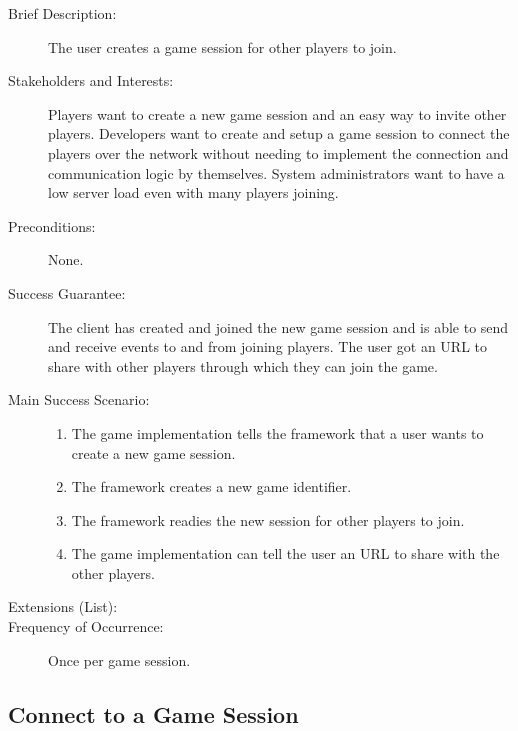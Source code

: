 \begin{description}
  \item[Brief Description:] The user creates a game session for other players
  to join.
  \item[Stakeholders and Interests:] Players want to create a new game session
  and an easy way to invite other players. Developers want to create and setup a
  game session to connect the players over the network without needing to
  implement the connection and communication logic by themselves. System
  administrators want to have a low server load even with many players joining.
  \item[Preconditions:] None.
  \item[Success Guarantee:] The client has created and joined the new game
  session and is able to send and receive events to and from joining players.
  The user got an URL to share with other players through which they can join
  the game.
  \item[Main Success Scenario:] \hfill
  \begin{enumerate}
    \item The game implementation tells the framework that a user wants to
    create a new game session.
    \item The framework creates a new game identifier.
    \item The framework readies the new session for other players to join.
    \item The game implementation can tell the user an URL to share with the
    other players.
  \end{enumerate}
  \item[Extensions (List):] \hfill
  \item[Frequency of Occurrence:] Once per game session.
\end{description}

\subsection{Connect to a Game Session}

